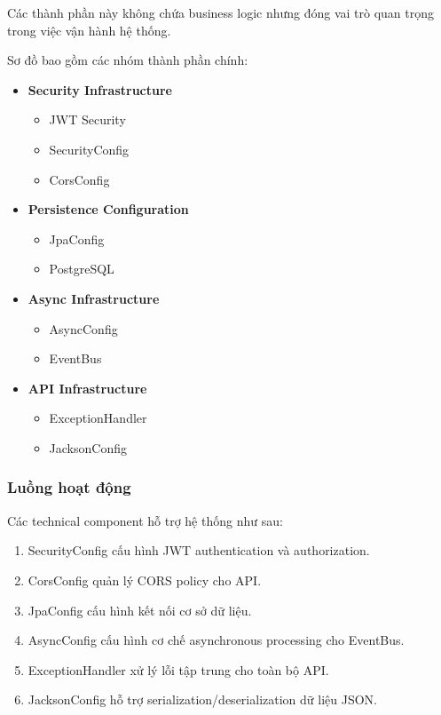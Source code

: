 Các thành phần này không chứa business logic nhưng đóng vai trò quan trọng trong việc vận hành hệ thống.

Sơ đồ bao gồm các nhóm thành phần chính:

\begin{itemize}
    \item \textbf{Security Infrastructure}
    \begin{itemize}
        \item JWT Security
        \item SecurityConfig
        \item CorsConfig
    \end{itemize}
    
    \item \textbf{Persistence Configuration}
    \begin{itemize}
        \item JpaConfig
        \item PostgreSQL
    \end{itemize}
    
    \item \textbf{Async Infrastructure}
    \begin{itemize}
        \item AsyncConfig
        \item EventBus
    \end{itemize}
    
    \item \textbf{API Infrastructure}
    \begin{itemize}
        \item ExceptionHandler
        \item JacksonConfig
    \end{itemize}
\end{itemize}

\subsubsection*{Luồng hoạt động}

Các technical component hỗ trợ hệ thống như sau:

\begin{enumerate}
    \item SecurityConfig cấu hình JWT authentication và authorization.
    
    \item CorsConfig quản lý CORS policy cho API.
    
    \item JpaConfig cấu hình kết nối cơ sở dữ liệu.
    
    \item AsyncConfig cấu hình cơ chế asynchronous processing cho EventBus.
    
    \item ExceptionHandler xử lý lỗi tập trung cho toàn bộ API.
    
    \item JacksonConfig hỗ trợ serialization/deserialization dữ liệu JSON.
\end{enumerate}


